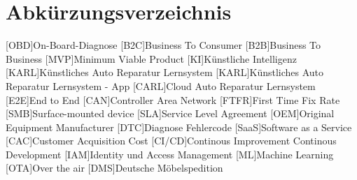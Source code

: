 \renewcommand{\nomname}{Abkürzungsverzeichnis}
\setlength{\nomlabelwidth}{.25\hsize}
\renewcommand{\nomlabel}[1]{#1 \dotfill}
\setlength{\nomitemsep}{-\parsep}
\printnomenclature
\section*{ \nomname {} }
\begin{acronym}
    [OBD]{On-Board-Diagnose}
    [B2C]{Business To Consumer}
    [B2B]{Business To Business}
    [MVP]{Minimum Viable Product}
    [KI]{Künstliche Intelligenz}
    [KARL]{Künstliches Auto Reparatur Lernsystem}
    [KARL]{Künstliches Auto Reparatur Lernsystem - App}
    [CARL]{Cloud Auto Reparatur Lernsystem}
    [E2E]{End to End}
    [CAN]{Controller Area Network}
    [FTFR]{First Time Fix Rate}
    [SMB]{Surface-mounted device}
    [SLA]{Service Level Agreement}
    [OEM]{Original Equipment Manufacturer}
    [DTC]{Diagnose Fehlercode}
    [SaaS]{Software as a Service}
    [CAC]{Customer Acquisition Cost}
    [CI/CD]{Continous Improvement Continous Development}
    [IAM]{Identity und Access Management}
    [ML]{Machine Learning}
    [OTA]{Over the air}
    [DMS]{Deutsche Möbelspedition}
\end{acronym}


\newpage
